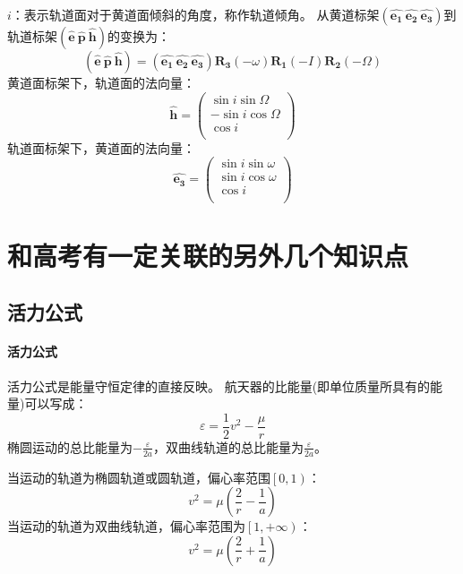 $i$：表示轨道面对于黄道面倾斜的角度，称作轨道倾角。
从黄道标架$(\hat{\boldsymbol{e_{1}}} \ \hat{\boldsymbol{e_{2}}} \ \hat{\boldsymbol{e_{3}}})$到轨道标架$(\hat{\boldsymbol{e}} \ \hat{\boldsymbol{p}} \ \hat{\boldsymbol{h}})$的变换为：
\begin{equation}
	(\hat{\boldsymbol{e}} \ \hat{\boldsymbol{p}} \ \hat{\boldsymbol{h}})=(\hat{\boldsymbol{e_{1}}} \ \hat{\boldsymbol{e_{2}}} \ \hat{\boldsymbol{e_{3}}})\boldsymbol{R_{3}}(-\omega)\boldsymbol{R_{1}}(-I)\boldsymbol{R_{2}}(-\Omega)
\end{equation}
黄道面标架下，轨道面的法向量：
\begin{equation}
	\hat{\boldsymbol{h}}=\begin{pmatrix}
		\sin i\sin \Omega\\
		-\sin i\cos \Omega \\
		\cos i\\
	\end{pmatrix}
\end{equation}
轨道面标架下，黄道面的法向量：
\begin{equation}
		\hat{\boldsymbol{e_{3}}}=\begin{pmatrix}
		\sin i\sin \omega\\
		\sin i\cos \omega \\
		\cos i\\
	\end{pmatrix}
\end{equation}

\section{和高考有一定关联的另外几个知识点}
\subsection{活力公式}
\paragraph{活力公式}
活力公式是能量守恒定律的直接反映。
航天器的比能量(即单位质量所具有的能量)可以写成：
\begin{equation}
	\varepsilon =\frac{1}{2}v^2-\frac{\mu}{r}
\end{equation}
椭圆运动的总比能量为$-\frac{\varepsilon}{2a}$，双曲线轨道的总比能量为$\frac{\varepsilon}{2a}$。

\noindent 当运动的轨道为椭圆轨道或圆轨道，偏心率范围$\left[0,1\right)$：
\begin{equation}
	v^2=\mu \left(\frac{2}{r}-\frac{1}{a}\right)
\end{equation}
当运动的轨道为双曲线轨道，偏心率范围为$\left[1,+\infty \right)$：
\begin{equation}
	v^2 = \mu \left(\frac{2}{r}+\frac{1}{a}\right)
\end{equation}

